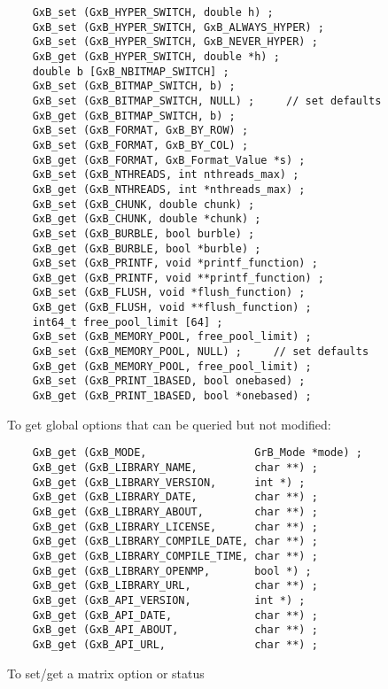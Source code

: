 \documentclass[12pt]{article}
\begin{document}
    {\footnotesize
    \begin{verbatim}
    GxB_set (GxB_HYPER_SWITCH, double h) ;
    GxB_set (GxB_HYPER_SWITCH, GxB_ALWAYS_HYPER) ;
    GxB_set (GxB_HYPER_SWITCH, GxB_NEVER_HYPER) ;
    GxB_get (GxB_HYPER_SWITCH, double *h) ;
    double b [GxB_NBITMAP_SWITCH] ;
    GxB_set (GxB_BITMAP_SWITCH, b) ;
    GxB_set (GxB_BITMAP_SWITCH, NULL) ;     // set defaults
    GxB_get (GxB_BITMAP_SWITCH, b) ;
    GxB_set (GxB_FORMAT, GxB_BY_ROW) ;
    GxB_set (GxB_FORMAT, GxB_BY_COL) ;
    GxB_get (GxB_FORMAT, GxB_Format_Value *s) ;
    GxB_set (GxB_NTHREADS, int nthreads_max) ;
    GxB_get (GxB_NTHREADS, int *nthreads_max) ;
    GxB_set (GxB_CHUNK, double chunk) ;
    GxB_get (GxB_CHUNK, double *chunk) ;
    GxB_set (GxB_BURBLE, bool burble) ;
    GxB_get (GxB_BURBLE, bool *burble) ;
    GxB_set (GxB_PRINTF, void *printf_function) ;
    GxB_get (GxB_PRINTF, void **printf_function) ;
    GxB_set (GxB_FLUSH, void *flush_function) ;
    GxB_get (GxB_FLUSH, void **flush_function) ;
    int64_t free_pool_limit [64] ;
    GxB_set (GxB_MEMORY_POOL, free_pool_limit) ;
    GxB_set (GxB_MEMORY_POOL, NULL) ;     // set defaults
    GxB_get (GxB_MEMORY_POOL, free_pool_limit) ;
    GxB_set (GxB_PRINT_1BASED, bool onebased) ;
    GxB_get (GxB_PRINT_1BASED, bool *onebased) ; \end{verbatim} }

\noindent
To get global options that can be queried but not modified:

    {\footnotesize
    \begin{verbatim}
    GxB_get (GxB_MODE,                 GrB_Mode *mode) ;
    GxB_get (GxB_LIBRARY_NAME,         char **) ;
    GxB_get (GxB_LIBRARY_VERSION,      int *) ;
    GxB_get (GxB_LIBRARY_DATE,         char **) ;
    GxB_get (GxB_LIBRARY_ABOUT,        char **) ;
    GxB_get (GxB_LIBRARY_LICENSE,      char **) ;
    GxB_get (GxB_LIBRARY_COMPILE_DATE, char **) ;
    GxB_get (GxB_LIBRARY_COMPILE_TIME, char **) ;
    GxB_get (GxB_LIBRARY_OPENMP,       bool *) ;
    GxB_get (GxB_LIBRARY_URL,          char **) ;
    GxB_get (GxB_API_VERSION,          int *) ;
    GxB_get (GxB_API_DATE,             char **) ;
    GxB_get (GxB_API_ABOUT,            char **) ;
    GxB_get (GxB_API_URL,              char **) ; \end{verbatim} }

\noindent
To set/get a matrix option or status
\end{document}
